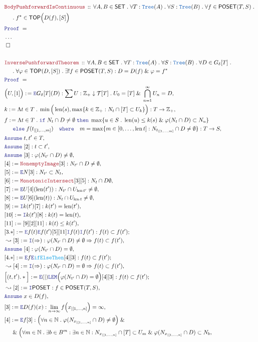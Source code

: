 \documentclass[12pt]{scrartcl}
\newcommand{\TYPE}[1]{\textcolor{NavyBlue}{\mathtt{#1}}}
\newcommand{\FUNC}[1]{\textcolor{Cerulean}{\mathtt{#1}}}
\newcommand{\LOGIC}[1]{\textcolor{Blue}{\mathtt{#1}}}
\newcommand{\THM}[1]{\textcolor{Maroon}{\mathtt{#1}}}
\renewcommand{\.}{\; . \;}
\newcommand{\de}{: \kern 0.1pc =}
\newcommand{\where}{\LOGIC{where}}
\newcommand{\If}{\LOGIC{if} \;}
\newcommand{\Then}{ \; \LOGIC{then} \;}
\newcommand{\Else}{\; \LOGIC{else} \;}
\newcommand{\Theorem}[2]{& \THM{#1} \, :: \, #2 \\ & \Proof = \\ }
\newcommand{\NewLine}{\\ & \kern 1pc}
\newcommand{\Page}[1]{ \begin{align*} #1 \end{align*}   }
\newcommand{\NoProof}{ & \ldots \\ \EndProof}
\renewcommand{\And}{\; \& \;}
\newcommand{\Imply}{\Rightarrow}
\newcommand{\Intro}{\LOGIC{I}}
\newcommand{\Elim}{\LOGIC{E}}
\newcommand{\Int}{\mathbb{Z} }
\newcommand{\Nat}{\mathbb{N} }
\newcommand{\Say}[3]{& #1 \de #2 : #3, \\}
\newcommand{\Conclude}[3]{& #1 \de #2 : #3; \\}
\newcommand{\Derive}[3]{& \leadsto #1 \de #2 : #3, \\}
\newcommand{\Assume}[2]{& \LOGIC{Assume} \; #1 : #2, \\}
\newcommand{\AssumeIn}[2]{& \LOGIC{Assume} \; #1 \in #2, \\}
\newcommand{\QED}{\; \square}
\newcommand{\EndProof}{& \QED \\}
\newcommand{\Proof}{\LOGIC{Proof} \; }
\newcommand{\SET}{\mathsf{SET}}
\newcommand{\POSET}{\mathsf{POSET}}
\newcommand{\TOP}{\mathsf{TOP}}
\newcommand{\T}{\mathcal{T}}
\newcommand{\Tree}{\TYPE{Tree}}
\DeclareMathOperator{\len}{len}
\newcommand{\inits}[2]{{#1}_{|\left[1,\ldots,#2\right]}}
\begin{document}
\Page{
	\Theorem{BodyPushforwardIsContinuous}
	{
		\forall A,B \in \SET \.
		\forall T : \Tree(A) \.
		\forall S : \Tree(B) \.
		\forall f \in \POSET(T,S) \. \NewLine \.
		f^* \in \TOP\Big( D(f), [S] \Big)
	}
	\NoProof
	\\
	\Theorem{InversePushforwardTheorem}
	{
		\forall A,B \in \SET \.
		\forall T : \Tree(A) \.
		\forall S : \Tree(B) \.
		\forall D \in G_\delta [T] \. \NewLine \. 
		\forall \varphi \in \TOP(D,[S]) \.
		\exists! f \in \POSET(T,S) :
		D = D(f) \And \varphi = f^*
	}
	\Say{\Big(U,[1]\Big)}{\Elim G_\delta[T](D) }
	{
		\sum U : \Int_+ \downarrow \T[T] \. U_0 = [T] \And \bigcap_{n=1}^\infty U_n = D
	}
	\Say{k}{\Lambda t \in T \. \min\Big( \len(s), \max\{ k \in \Int_+ : N_t \cap [T]\subset U_k\}\Big)}
	{
		T \to \Int_+
	}
	\Say{f}
	{
		\Lambda t \in T \. 
		\If N_t \cap D \neq \emptyset 
		\Then \max\{ u \in S \. \len(u) \le k(s) \And \varphi(N_t\cap D) \subset N_u \} \NewLine 
		\Else f(\inits{t}{m}) \quad \where \quad m = \max \{ m \in [0,\ldots,\len t] : N_{\inits{t}{m}} \cap D \neq \emptyset\} 
	}
	{
		T \to S
	}
	\AssumeIn{t,t'}{T}
	\Assume{[2]}{t \subset t'}
	\Assume{[3]}{\varphi(N_{t'} \cap D) \neq \emptyset}
	\Say{[4]}{ \THM{NonemptyImage}[3] }{N_{t'} \cap D \neq \emptyset}
	\Say{[5]}{\Elim N [3]}{N_{t'} \subset N_t}
	\Say{[6]}{ \THM{MonotonicIntersect}[3][5] }{N_t \cap D \emptyset}
	\Say{[7]}{\Elim U [4](\len(t'))}{N_{t'} \cap U_{\len t'} \neq \emptyset}
	\Say{[8]}{\Elim U[6](\len(t))}{N_{t} \cap U_{\len t} \neq \emptyset}
	\Say{[9]}{\Intro k(t')[7]}{k(t') = \len(t')}
	\Say{[10]}{\Intro k(t')[8]}{k(t) = \len(t)}
	\Say{[11]}{[9][2][11]}{k(t) \le k(t')}
	\Conclude{[3.*]}{\Elim f(t) \Elim f(t')[5][11] \Intro f(t) \Intro f(t') }
	{
		f(t) \subset f(t')
	}
	\Derive{[3]}{\Intro(\Imply)}
	{
		\varphi(N_{t'} \cap D) \neq \emptyset \Imply f(t) \subset f(t') 
	}
	\Assume{[4]}{\varphi(N_{t'} \cap D)=\emptyset}
	\Conclude{[4.*]}{\Elim f \Elim \FUNC{ifElseThen} [4][3]}
	{
		f(t) \subset f(t')
	}
	\Derive{[4]}{\Intro(\Imply)}{\varphi(N_{t'} \cap D) = \emptyset \Imply f(t) \subset f(t') }
	\Conclude{\Big[(t,t').*\Big]}{ \Elim(|)\LOGIC{LEM}\Big(\varphi(N_{t'} \cap D) = \emptyset\Big)[4][3]  }
	{
		f(t)	\subset f(t')
	}
	\Derive{[2]}{\Intro \POSET}{f \in \POSET(T,S)}
	\AssumeIn{x}{D(f)}
	\Say{[3]}{\Elim D(f)(x)}{\lim_{n \to \infty} f\Big( \inits{x}{n}\Big) = \infty}
	\Say{[4]}{\Elim f [3]}{ 
		\Big(\forall n \in \Nat \.  \varphi( N_{\inits{x}{n}} \cap D) \neq \emptyset\Big)
		\And \NewLine \And
		\Big( \forall m \in \Nat \. \exists b \in B^m : \exists n \in \Nat :
			N_{\inits{x}{n}} \cap [T] \subset U_m \And 
			\varphi( N_{\inits{x}{n}} \cap D  ) \subset N_b		
}}
\end{document}
